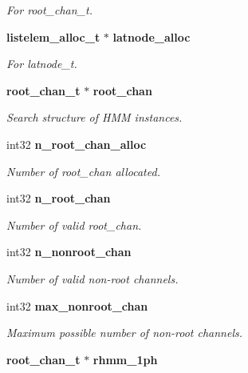 \begin{DoxyCompactItemize}
\begin{DoxyCompactList}\small\item\em For root\-\_\-chan\-\_\-t. \end{DoxyCompactList}\item 
{\bf listelem\-\_\-alloc\-\_\-t} $\ast$ {\bf latnode\-\_\-alloc}\label{structngram__search__s_a21600dc2e23744f0be9c64a4db8d7e50}

\begin{DoxyCompactList}\small\item\em For latnode\-\_\-t. \end{DoxyCompactList}\item 
{\bf root\-\_\-chan\-\_\-t} $\ast$ {\bf root\-\_\-chan}
\begin{DoxyCompactList}\small\item\em Search structure of H\-M\-M instances. \end{DoxyCompactList}\item 
int32 {\bf n\-\_\-root\-\_\-chan\-\_\-alloc}\label{structngram__search__s_abc8a67e3f64adc470c78dfdd23be4126}

\begin{DoxyCompactList}\small\item\em Number of root\-\_\-chan allocated. \end{DoxyCompactList}\item 
int32 {\bf n\-\_\-root\-\_\-chan}\label{structngram__search__s_a297d8bdb856617490ee8ccd99df70e68}

\begin{DoxyCompactList}\small\item\em Number of valid root\-\_\-chan. \end{DoxyCompactList}\item 
int32 {\bf n\-\_\-nonroot\-\_\-chan}\label{structngram__search__s_a043723786367f5026dce99c261f7086d}

\begin{DoxyCompactList}\small\item\em Number of valid non-\/root channels. \end{DoxyCompactList}\item 
int32 {\bf max\-\_\-nonroot\-\_\-chan}\label{structngram__search__s_a4b2b42349e9e3df7e93b4a7d6994f63f}

\begin{DoxyCompactList}\small\item\em Maximum possible number of non-\/root channels. \end{DoxyCompactList}\item 
{\bf root\-\_\-chan\-\_\-t} $\ast$ {\bf rhmm\-\_\-1ph}\label{structngram__search__s_a1ffa3c9100252122ae8a2a713c50b527}


\end{DoxyCompactItemize}
